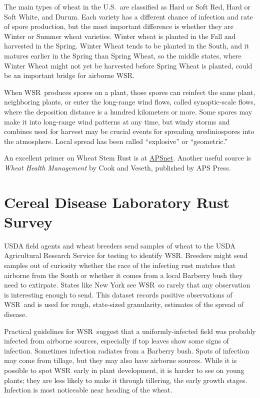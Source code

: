 \documentclass{article}
\newcommand{\wsr}{\textsc{WSR}}
\begin{document}
The main types of wheat in the U.S.\ are classified as Hard or Soft Red, Hard or Soft White, and Durum. Each variety has a different chance of infection and rate of spore production, but the most important difference is whether they are Winter or Summer wheat varieties. Winter wheat is planted in the Fall and harvested in the Spring. Winter Wheat tends to be planted in the South, and it matures earlier in the Spring than Spring Wheat, so the middle states, where Winter Wheat might not yet be harvested before Spring Wheat is planted, could be an important bridge for airborne \wsr.

When \wsr\ produces spores on a plant, those spores can reinfect the same plant, neighboring plants, or enter the long-range wind flows, called synoptic-scale flows, where the deposition distance is a hundred kilometers or more. Some spores may make it into long-range wind patterns at any time, but windy storms and combines used for harvest may be crucial events for spreading urediniospores into the atmosphere. Local spread has been called ``explosive'' or ``geometric.''

An excellent primer on Wheat Stem Rust is at \href{http://www.apsnet.org/edcenter/intropp/lessons/fungi/Basidiomycetes/Pages/StemRust.aspx}{APSnet}. Another useful source is \textit{Wheat Health Management} by Cook and Veseth, published by APS Press.


\section{Cereal Disease Laboratory Rust Survey}

USDA field agents and wheat breeders send samples of wheat to the USDA Agricultural Research Service for testing to identify \wsr. Breeders might
send samples out of curiosity whether the race of the infecting rust matches that airborne from the South or whether it comes from a local Barberry bush they need to extirpate. States like New York see \wsr\ so rarely that any observation is interesting enough to send. This dataset records positive observations of \wsr\ and is used for rough, state-sized granularity, estimates of the spread of disease.

Practical guidelines for \wsr\ suggest that a uniformly-infected field was probably infected from airborne sources, especially if top leaves show some signs of infection. Sometimes infection radiates from a Barberry bush. Spots of infection may come from tillage, but they may also have airborne sources. While it is possible to spot \wsr\ early in plant development, it is harder to see on young plants; they are less likely to make it through tillering, the early growth stages. Infection is most noticeable near heading of the wheat.
\end{document}
